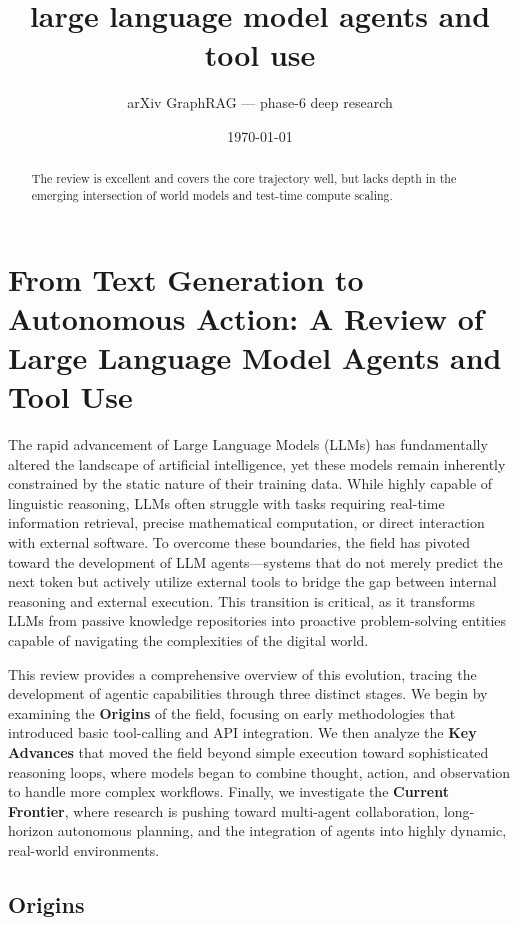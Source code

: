 \documentclass[11pt]{article}
\title{large language model agents and tool use}
\author{arXiv GraphRAG --- phase-6 deep research}
\date{\today}
\begin{document}
\maketitle

\begin{abstract}
The review is excellent and covers the core trajectory well, but lacks depth in the emerging intersection of world models and test-time compute scaling.
\end{abstract}

\section{From Text Generation to Autonomous Action: A Review of Large Language Model Agents and Tool Use}

The rapid advancement of Large Language Models (LLMs) has fundamentally altered the landscape of artificial intelligence, yet these models remain inherently constrained by the static nature of their training data. While highly capable of linguistic reasoning, LLMs often struggle with tasks requiring real-time information retrieval, precise mathematical computation, or direct interaction with external software. To overcome these boundaries, the field has pivoted toward the development of LLM agents—systems that do not merely predict the next token but actively utilize external tools to bridge the gap between internal reasoning and external execution. This transition is critical, as it transforms LLMs from passive knowledge repositories into proactive problem-solving entities capable of navigating the complexities of the digital world.

This review provides a comprehensive overview of this evolution, tracing the development of agentic capabilities through three distinct stages. We begin by examining the \textbf{Origins} of the field, focusing on early methodologies that introduced basic tool-calling and API integration. We then analyze the \textbf{Key Advances} that moved the field beyond simple execution toward sophisticated reasoning loops, where models began to combine thought, action, and observation to handle more complex workflows. Finally, we investigate the \textbf{Current Frontier}, where research is pushing toward multi-agent collaboration, long-horizon autonomous planning, and the integration of agents into highly dynamic, real-world environments.

\subsection{Origins}
\end{document}
